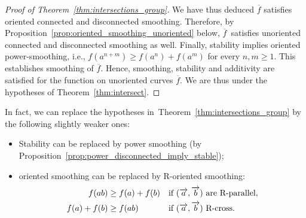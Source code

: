 \begin{proof}[Proof of Theorem~\ref{thm:intersections_group}]
We have thus deduced $\overline{f}$ satisfies oriented connected and disconnected smoothing. Therefore, by Proposition~\ref{prop:oriented_smoothing_unoriented} below,
$\overline{f}$~satisfies unoriented connected and disconnected smoothing as well. 
Finally, stability implies oriented power-smoothing, i.e., $f(a^{n+m}) \geq f(a^n) + f(a^m)$ for every $n, m \geq 1$. This establishes smoothing of $\overline{f}$. Hence, smoothing, stability and additivity are satisfied for the function on unoriented curves $\overline{f}$.
We are thus under the
hypotheses of Theorem~\ref{thm:intersect}.
\end{proof}

\begin{remark}
In fact, we can replace the hypotheses in~Theorem~\ref{thm:intersections_group} by the following slightly weaker ones:
\begin{itemize}
 \item Stability can be replaced by power smoothing (by Proposition~\ref{prop:power_disconnected_imply_stable});
\item oriented smoothing can be replaced by R-oriented smoothing:
 \begin{align}
f(ab) &\ge f(a) + f(b)
&& \text{if } (\overrightarrow{a},\overrightarrow{b}) \text{ are R-parallel}, \\
f(a) + f(b) &\ge f(ab)
&& \text{if } (\overrightarrow{a},\overrightarrow{b}) \text{ R-cross}.
\end{align}
\end{itemize}
\end{remark}



